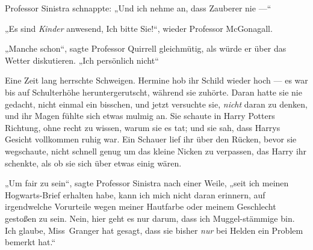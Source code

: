 Professor Sinistra schnappte:
„Und ich nehme an, dass Zauberer nie —“

„Es sind \emph{Kinder} anwesend, Ich bitte Sie!“, wieder Professor McGonagall.

„Manche schon“, sagte Professor Quirrell gleichmütig, als würde er über das Wetter diskutieren.
„Ich persönlich nicht“

Eine Zeit lang herrschte Schweigen. Hermine hob ihr Schild wieder hoch — es war bis auf Schulterhöhe heruntergerutscht, während sie zuhörte. Daran hatte sie nie gedacht, nicht einmal ein bisschen, und jetzt versuchte sie, \emph{nicht} daran zu denken, und ihr Magen fühlte sich etwas mulmig an. Sie schaute in Harry Potters Richtung, ohne recht zu wissen, warum sie es tat; und sie sah, dass Harrys Gesicht vollkommen ruhig war. Ein Schauer lief ihr über den Rücken, bevor sie wegschaute, nicht schnell genug um das kleine Nicken zu verpassen, das Harry ihr schenkte, als ob sie sich über etwas einig wären.

„Um fair zu sein“, sagte Professor Sinistra nach einer Weile, „seit ich meinen Hogwarts-Brief erhalten habe, kann ich mich nicht daran erinnern, auf irgendwelche Vorurteile wegen meiner Hautfarbe oder meinem Geschlecht gestoßen zu sein. Nein, hier geht es nur darum, dass ich Muggel-stämmige bin. Ich glaube, Miss~Granger hat gesagt, dass sie bisher \emph{nur} bei Helden ein Problem bemerkt hat.“

